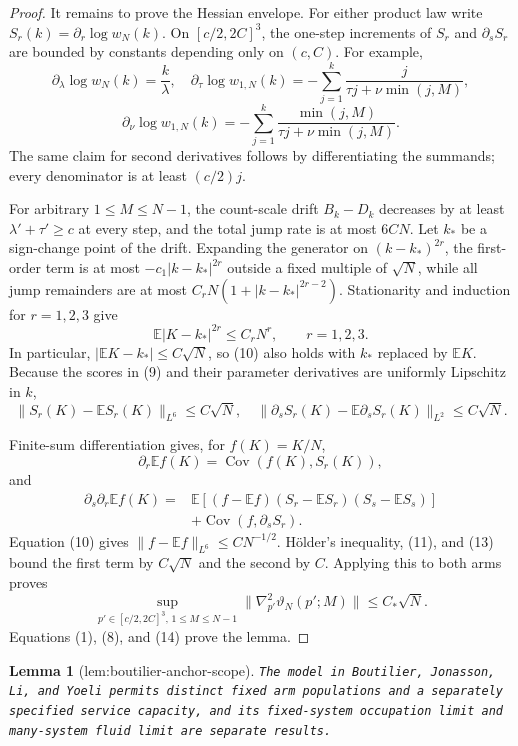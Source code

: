 \documentclass{article}
\newtheorem{lemma}{Lemma}
\begin{document}
\begin{proof}
It remains to prove the Hessian envelope.  For either product law write \(S_r(k)=\partial_r\log w_N(k)\).  On \([c/2,2C]^3\), the one-step increments of \(S_r\) and \(\partial_sS_r\) are bounded by constants depending only on \((c,C)\).  For example,
\[
 \partial_\lambda\log w_N(k)=\frac{k}{\lambda},
 \quad
 \partial_\tau\log w_{1,N}(k)
 =-\sum_{j=1}^k\frac{j}{\tau j+\nu\min(j,M)},
\]
\[
 \partial_\nu\log w_{1,N}(k)
 =-\sum_{j=1}^k\frac{\min(j,M)}{\tau j+\nu\min(j,M)}.        \tag{9}
\]
The same claim for second derivatives follows by differentiating the summands; every denominator is at least \((c/2)j\).

For arbitrary \(1\leq M\leq N-1\), the count-scale drift \(B_k-D_k\) decreases by at least \(\lambda'+\tau'\geq c\) at every step, and the total jump rate is at most \(6CN\).  Let \(k_*\) be a sign-change point of the drift.  Expanding the generator on \((k-k_*)^{2r}\), the first-order term is at most \(-c_1|k-k_*|^{2r}\) outside a fixed multiple of \(\sqrt N\), while all jump remainders are at most \(C_rN(1+|k-k_*|^{2r-2})\).  Stationarity and induction for \(r=1,2,3\) give
\[
 \mathbb E|K-k_*|^{2r}\leq C_rN^r,
 \qquad r=1,2,3.                                               \tag{10}
\]
In particular, \(|\mathbb EK-k_*|\leq C\sqrt N\), so (10) also holds with \(k_*\) replaced by \(\mathbb EK\).  Because the scores in (9) and their parameter derivatives are uniformly Lipschitz in \(k\),
\[
 \|S_r(K)-\mathbb ES_r(K)\|_{L^6}\leq C\sqrt N,
 \quad
 \|\partial_sS_r(K)-\mathbb E\partial_sS_r(K)\|_{L^2}
 \leq C\sqrt N.                                               \tag{11}
\]

Finite-sum differentiation gives, for \(f(K)=K/N\),
\[
 \partial_r\mathbb Ef(K)=\operatorname{Cov}(f(K),S_r(K)),     \tag{12}
\]
and
\[
 \begin{split}
 \partial_s\partial_r\mathbb Ef(K)
 ={}&\mathbb E[(f-\mathbb Ef)(S_r-\mathbb ES_r)(S_s-\mathbb ES_s)]\\
 &+\operatorname{Cov}(f,\partial_sS_r).                        \tag{13}
 \end{split}
\]
Equation (10) gives \(\|f-\mathbb Ef\|_{L^6}\leq C N^{-1/2}\).  H\"older's inequality, (11), and (13) bound the first term by \(C\sqrt N\) and the second by \(C\).  Applying this to both arms proves
\[
 \sup_{p'\in[c/2,2C]^3,\,1\leq M\leq N-1}
 \|\nabla_{p'}^2\vartheta_N(p';M)\|\leq C_*\sqrt N.          \tag{14}
\]
Equations (1), (8), and (14) prove the lemma.
\end{proof}

\begin{lemma}[lem:boutilier-anchor-scope]\label{lem:boutilier-anchor-scope}
\texttt{The model in Boutilier,\allowbreak{} Jonasson,\allowbreak{} Li,\allowbreak{} and Yoeli permits distinct fixed arm populations and a separately specified service capacity,\allowbreak{} and its fixed-\allowbreak{}system occupation limit and many-\allowbreak{}system fluid limit are separate results.}
\end{lemma}
\end{document}

